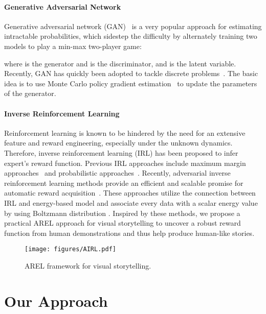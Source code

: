 \documentclass[11pt,a4paper]{article}
\begin{document}
\paragraph{Generative Adversarial Network}
Generative adversarial network (GAN)~\cite{goodfellow2014generative} is a very popular approach for estimating intractable probabilities, which sidestep the difficulty by alternately training two models to play a min-max two-player game:

where  is the generator and  is the discriminator, and  is the latent variable. Recently, GAN has quickly been adopted to tackle discrete problems~\cite{yu2017seqgan,Dai_2017_ICCV,wang2018show}. The basic idea is to use Monte Carlo policy gradient estimation~\cite{williams1992simple} to update the parameters of the generator.     

\paragraph{Inverse Reinforcement Learning}
Reinforcement learning is known to be hindered by the need for an extensive feature and reward engineering, especially under the unknown dynamics. Therefore, inverse reinforcement learning (IRL) has been proposed to infer expert's reward function. Previous IRL approaches include maximum margin approaches~\cite{abbeel2004apprenticeship,ratliff2006maximum} and probabilistic approaches~\cite{ziebart2010modeling,ziebart2008maximum}. Recently, adversarial inverse reinforcement learning methods provide an efficient and scalable promise for automatic reward acquisition~\cite{ho2016generative,finn2016connection,fu2017learning,henderson2017optiongan}. These approaches utilize the connection between IRL and energy-based model and associate every data with a scalar energy value by using Boltzmann distribution . Inspired by these methods, we propose a practical AREL approach for visual storytelling to uncover a robust reward function from human demonstrations and thus help produce human-like stories.

\begin{figure}
\begin{center}
\texttt{[image: figures/AIRL.pdf]}  
\end{center}
\vspace*{-1ex}
   \caption{AREL framework for visual storytelling.}
\label{fig:AREL}
\end{figure}


\section{Our Approach}
\end{document}
